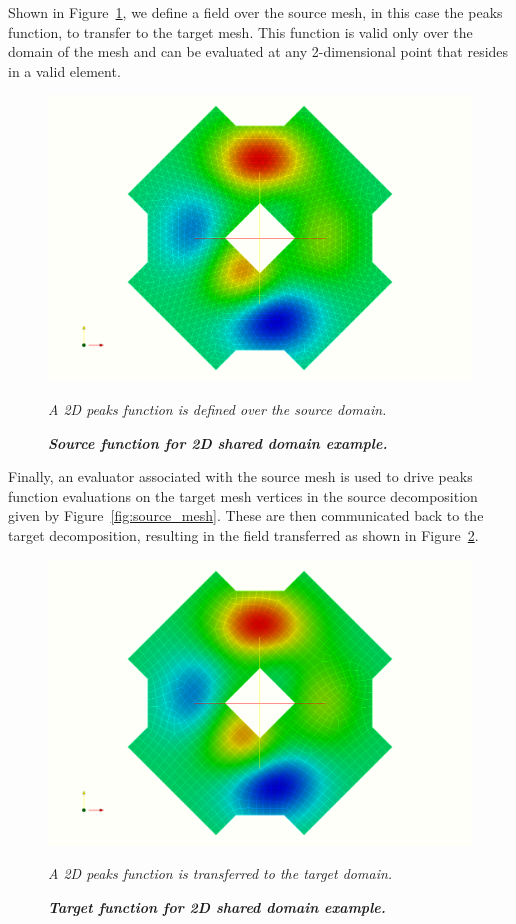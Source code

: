 \documentclass[letterpaper,12pt]{article}
\begin{document}
Shown in Figure~\ref{fig:source_field}, we define a field over the
source mesh, in this case the peaks function, to transfer to the
target mesh. This function is valid only over the domain of the mesh
and can be evaluated at any 2-dimensional point that resides in a
valid element.

\begin{figure}[htpb!]
  \centering \includegraphics[width=5.5in]{tri_peaks.png}
  \caption{\bf \sl Source function for 2D shared domain example.}{\sl
    A 2D peaks function is defined over the source domain.}
  \label{fig:source_field}
\end{figure}

Finally, an evaluator associated with the source mesh is used to drive
peaks function evaluations on the target mesh vertices in the source
decomposition given by Figure~\ref{fig:source_mesh}. These are then
communicated back to the target decomposition, resulting in the field
transferred as shown in Figure~\ref{fig:target_field}.

\begin{figure}[htpb!]
  \centering
  \includegraphics[width=5.5in]{quad_peaks.png}
  \caption{\bf \sl Target function for 2D shared domain example.}{\sl
    A 2D peaks function is transferred to the target domain.}
  \label{fig:target_field}
\end{figure}
\end{document}
